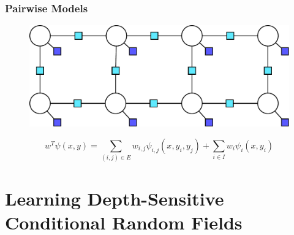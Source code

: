 \documentclass[final,ignorenonframetext,compress]{beamer}
\begin{document}
\begin{frame}
    \frametitle{Pairwise Models}
    \begin{centering}
        \begin{figure}
            \includegraphics[width=.7\linewidth]{images/pairwise_factorgraph2}
        \end{figure}
    \end{centering}
    \vspace{5mm}
    \[w^T \psi(x, y) = \sum_{(i, j) \in E} w_{i,j} \psi_{i,j}(x, y_i, y_j) + \sum_{i\in I} w_i \psi_i(x, y_i)\]
\end{frame}

\section{Learning Depth-Sensitive Conditional Random Fields}
\end{document}
